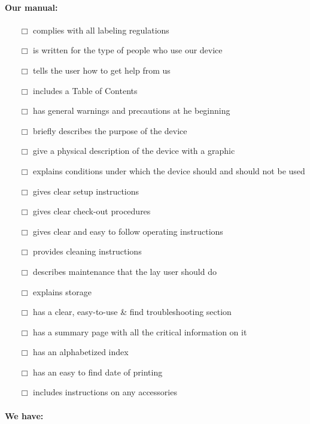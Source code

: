 \documentclass[12pt, letterpaper, oneside]{article}
\begin{document}
\begin{multicols}{2}
\sffamily

\paragraph{Our manual:}

\begin{itemize} \itemsep -2pt
	\item[$\Box$] complies with all labeling regulations
	\item[$\Box$]  is written for the type of people who use our device
	\item[$\Box$]  tells the user how to get help from us
	\item[$\Box$]  includes a Table of Contents
	\item[$\Box$]  has general warnings and precautions at he beginning
	\item[$\Box$]  briefly describes the purpose of the device
	\item[$\Box$]  give a physical description of the device with a graphic
	\item[$\Box$]  explains conditions under which the device should and should not be used
	\item[$\Box$]  gives clear setup instructions
	\item[$\Box$]  gives clear check-out procedures
	\item[$\Box$]  gives clear and easy to follow operating instructions
	\item[$\Box$]  provides cleaning instructions
	\item[$\Box$]  describes maintenance that the lay user should do
	\item[$\Box$]  explains storage
	\item[$\Box$]  has a clear, easy-to-use \& find troubleshooting section
	\item[$\Box$]  has a summary page with all the critical information on it
	\item[$\Box$]  has an alphabetized index
	\item[$\Box$]  has an easy to find date of printing
	\item[$\Box$]  includes instructions on any accessories
\end{itemize}

\paragraph{We have:}


\end{multicols}
\end{document}
